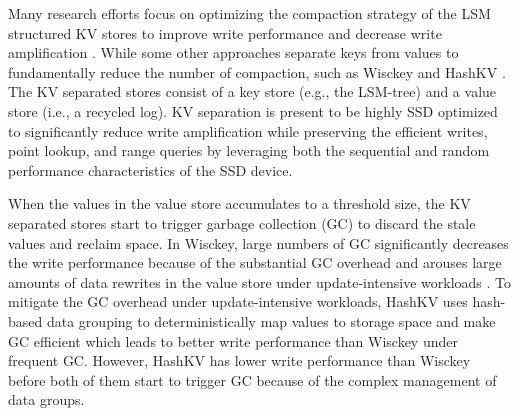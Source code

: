\documentclass[sigconf]{acmart}
\begin{document}
Many research efforts focus on optimizing the compaction strategy of the LSM structured KV stores to improve write performance \cite{HyperLevelDB,bLSM,PCP,cLSM,CM} and decrease write amplification \cite{LSMtrie,skiptree,LWCtree,TRIAD}. While some other approaches separate keys from values to fundamentally reduce the number of compaction, such as Wisckey \cite{Wisckey} and HashKV \cite{HashKV}. The KV separated stores consist of a key store (e.g., the LSM-tree) and a value store (i.e., a recycled log). KV separation is present to be highly SSD optimized to significantly reduce write amplification while preserving the efficient writes, point lookup, and range queries by leveraging both the sequential and random performance characteristics of the SSD device.


When the values in the value store accumulates to a threshold size, the KV separated stores start to trigger garbage collection (GC) to discard the stale values and reclaim space. In Wisckey, large numbers of GC significantly decreases the write performance because of the substantial GC overhead \cite{Wisckey} and arouses large amounts of data rewrites in the value store under update-intensive workloads \cite{HashKV}. To mitigate the GC overhead under update-intensive workloads, HashKV uses hash-based data grouping to deterministically map values to storage space and make GC efficient which leads to better write performance than Wisckey under frequent GC. However, HashKV has lower write performance than Wisckey before both of them start to trigger GC because of the complex management of data groups.
\end{document}

